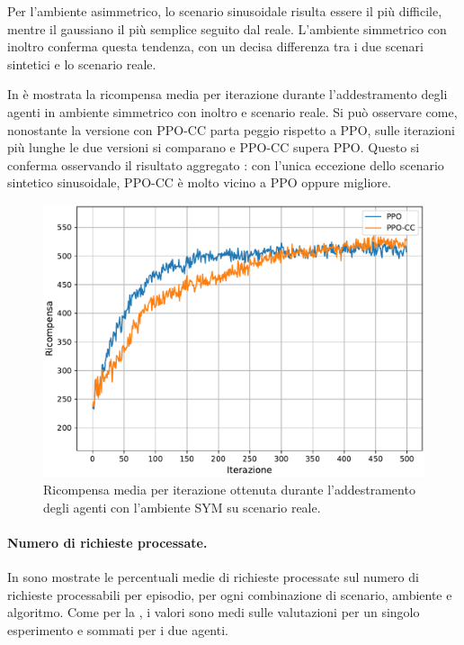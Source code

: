Per l'ambiente asimmetrico, lo scenario sinusoidale risulta essere il più difficile, mentre il gaussiano il più semplice seguito dal reale. L'ambiente simmetrico con inoltro conferma questa tendenza, con un decisa differenza tra i due scenari sintetici e lo scenario reale.

In  è mostrata la ricompensa media per iterazione durante l'addestramento degli agenti in ambiente simmetrico con inoltro e scenario reale. Si può osservare come, nonostante la versione con PPO-CC parta peggio rispetto a PPO, sulle iterazioni più lunghe le due versioni si comparano e PPO-CC supera PPO. Questo si conferma osservando il risultato aggregato : con l'unica eccezione dello scenario sintetico sinusoidale, PPO-CC è molto vicino a PPO oppure migliore.

\begin{figure}
    \centering
    \includegraphics[width=.7\linewidth]{assets/5/results/train_real_summary_reward.pdf}
    \caption{Ricompensa media per iterazione ottenuta durante l'addestramento degli agenti con l'ambiente SYM su scenario reale.}
    \label{fig:5_train_real_reward}
\end{figure}

\paragraph{Numero di richieste processate.} In  sono mostrate le percentuali medie di richieste processate sul numero di richieste processabili per episodio, per ogni combinazione di scenario, ambiente e algoritmo. Come per la , i valori sono medi sulle valutazioni per un singolo esperimento e sommati per i due agenti.

